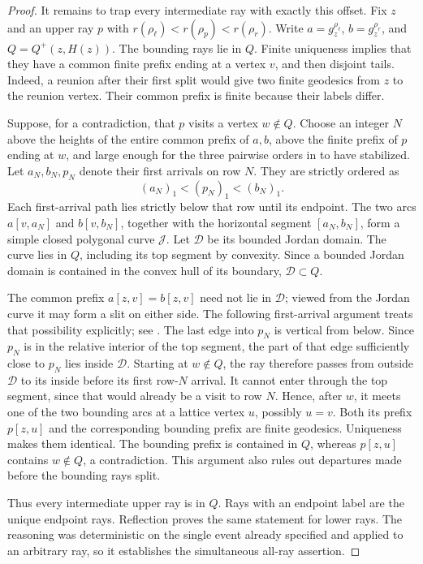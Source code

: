 \begin{proof}
It remains to trap every intermediate ray with exactly this offset.
Fix $z$ and an upper ray $p$ with
$r(\rho_\ell)<r(\rho_p)<r(\rho_r)$.  Write
$a=g^{\rho_\ell}_z$, $b=g^{\rho_r}_z$, and $Q=Q^+(z,H(z))$.
The bounding rays lie in $Q$.  Finite uniqueness implies that they have
a common finite prefix ending at a vertex $v$, and then disjoint tails.
Indeed, a reunion after their first split would give two finite
geodesics from $z$ to the reunion vertex.  Their common prefix is finite
because their labels differ.

Suppose, for a contradiction, that $p$ visits a vertex $w\notin Q$.
Choose an integer $N$ above the heights of the entire common prefix of
$a,b$, above the finite prefix of $p$ ending at $w$, and large enough
for the three pairwise orders in  to have stabilized.
Let $a_N,b_N,p_N$ denote their first arrivals on row $N$.  They are
strictly ordered as
\[
 (a_N)_1<(p_N)_1<(b_N)_1.
\]
Each first-arrival path lies strictly below that row until its endpoint.
The two arcs $a[v,a_N]$ and $b[v,b_N]$, together with the horizontal
segment $[a_N,b_N]$, form a simple closed polygonal curve $\mathcal J$.
Let $\mathcal D$ be its bounded Jordan domain.  The curve lies in $Q$,
including its top segment by convexity.  Since a bounded Jordan domain
is contained in the convex hull of its boundary, $\mathcal D\subset Q$.

The common prefix $a[z,v]=b[z,v]$ need not lie in $\mathcal D$; viewed
from the Jordan curve it may form a slit on either side.  The following
first-arrival argument treats that possibility explicitly; see
.  The last
edge into $p_N$ is vertical from below.  Since $p_N$ is in the relative
interior of the top segment, the part of that edge sufficiently close
to $p_N$ lies inside $\mathcal D$.  Starting at $w\notin Q$, the ray
therefore passes from outside $\mathcal D$ to its inside before its
first row-$N$ arrival.  It cannot enter through the top segment, since
that would already be a visit to row $N$.  Hence, after $w$, it meets
one of the two bounding arcs at a lattice vertex $u$, possibly $u=v$.
Both its prefix $p[z,u]$ and the corresponding bounding prefix are
finite geodesics.  Uniqueness makes them identical.  The bounding
prefix is contained in $Q$, whereas $p[z,u]$ contains $w\notin Q$,
a contradiction.  This argument also rules out departures made before
the bounding rays split.



Thus every intermediate upper ray is in $Q$.  Rays with an endpoint
label are the unique endpoint rays.  Reflection proves the same
statement for lower rays.  The reasoning was deterministic on the
single event already specified and applied to an arbitrary ray, so it
establishes the simultaneous all-ray assertion.
\end{proof}

